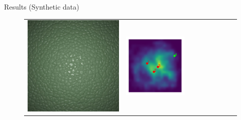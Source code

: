 \documentclass[final]{beamer}
\newlength{\twocolwid}
\newlength{\resultwidth}
\begin{document}
\begin{frame}[t]
\begin{columns}[t]
\begin{column}{\twocolwid}
\begin{block}{Results (Synthetic data)}
\begin{figure}[t]
\begin{tabular}{ccrclcccc}
            		\includegraphics[width=\resultwidth]{synth/leather/optim.jpg} &
            		\includegraphics[width=\resultwidth]{synth/leather/posterior.pdf} &

\end{tabular}
\end{figure}
\end{block}
\end{column}
\end{columns}
\end{frame}
\end{document}
